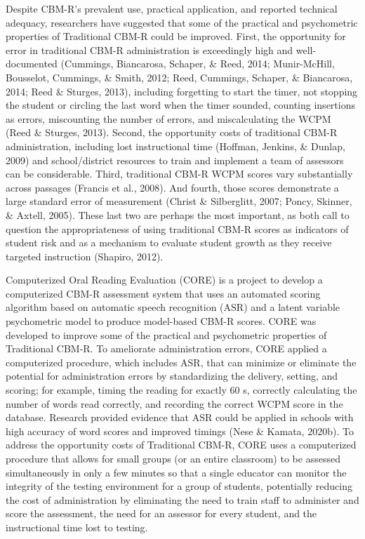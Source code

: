 \documentclass[
  english,
  man, fleqn, noextraspace]{apa6}
\begin{document}
Despite CBM-R's prevalent use, practical application, and reported technical adequacy, researchers have suggested that some of the practical and psychometric properties of Traditional CBM-R could be improved. First, the opportunity for error in traditional CBM-R administration is exceedingly high and well-documented (Cummings, Biancarosa, Schaper, \& Reed, 2014; Munir-McHill, Bousselot, Cummings, \& Smith, 2012; Reed, Cummings, Schaper, \& Biancarosa, 2014; Reed \& Sturges, 2013), including forgetting to start the timer, not stopping the student or circling the last word when the timer sounded, counting insertions as errors, miscounting the number of errors, and miscalculating the WCPM (Reed \& Sturges, 2013). Second, the opportunity costs of traditional CBM-R administration, including lost instructional time (Hoffman, Jenkins, \& Dunlap, 2009) and school/district resources to train and implement a team of assessors can be considerable. Third, traditional CBM-R WCPM scores vary substantially across passages (Francis et al., 2008). And fourth, those scores demonstrate a large standard error of measurement (Christ \& Silberglitt, 2007; Poncy, Skinner, \& Axtell, 2005). These last two are perhaps the most important, as both call to question the appropriateness of using traditional CBM-R scores as indicators of student risk and as a mechanism to evaluate student growth as they receive targeted instruction (Shapiro, 2012).

Computerized Oral Reading Evaluation (CORE) is a project to develop a computerized CBM-R assessment system that uses an automated scoring algorithm based on automatic speech recognition (ASR) and a latent variable psychometric model to produce model-based CBM-R scores. CORE was developed to improve some of the practical and psychometric properties of Traditional CBM-R. To ameliorate administration errors, CORE applied a computerized procedure, which includes ASR, that can minimize or eliminate the potential for administration errors by standardizing the delivery, setting, and scoring; for example, timing the reading for exactly 60 s, correctly calculating the number of words read correctly, and recording the correct WCPM score in the database. Research provided evidence that ASR could be applied in schools with high accuracy of word scores and improved timings (Nese \& Kamata, 2020b). To address the opportunity costs of Traditional CBM-R, CORE uses a computerized procedure that allows for small groups (or an entire classroom) to be assessed simultaneously in only a few minutes so that a single educator can monitor the integrity of the testing environment for a group of students, potentially reducing the cost of administration by eliminating the need to train staff to administer and score the assessment, the need for an assessor for every student, and the instructional time lost to testing.
\end{document}
